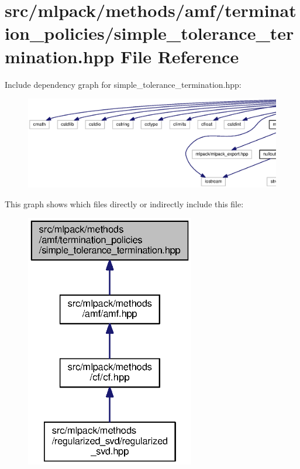 \section{src/mlpack/methods/amf/termination\+\_\+policies/simple\+\_\+tolerance\+\_\+termination.hpp File Reference}
\label{simple__tolerance__termination_8hpp}
Include dependency graph for simple\+\_\+tolerance\+\_\+termination.\+hpp\+:
\nopagebreak
\begin{figure}[H]
\begin{center}
\leavevmode
\includegraphics[width=350pt]{simple__tolerance__termination_8hpp__incl}
\end{center}
\end{figure}
This graph shows which files directly or indirectly include this file\+:
\nopagebreak
\begin{figure}[H]
\begin{center}
\leavevmode
\includegraphics[width=209pt]{simple__tolerance__termination_8hpp__dep__incl}
\end{center}
\end{figure}
